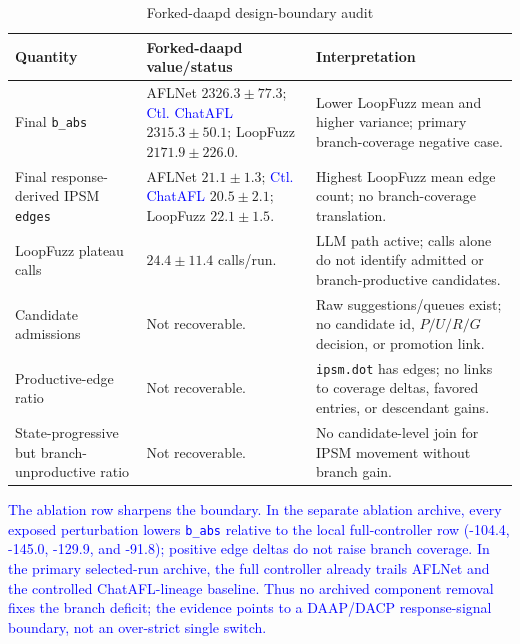 \documentclass[final,5p,times,number]{elsarticle}
\begin{document}
\begin{table}[!t]
\centering
\caption{Forked-daapd design-boundary audit}
\label{tab:forked_design_boundary}
{\scriptsize
\setlength{\tabcolsep}{3.2pt}
\renewcommand{\arraystretch}{0.95}
\begin{tabularx}{\textwidth}{>{\raggedright\arraybackslash}p{}
                              >{\raggedright\arraybackslash}p{}
                              X}
\toprule
\textbf{Quantity} & \textbf{Forked-daapd value/status} & \textbf{Interpretation} \\
\midrule
Final \texttt{b\_abs} &
AFLNet $2326.3{\pm}77.3$; \textcolor{blue}{Ctl. ChatAFL} $2315.3{\pm}50.1$; LoopFuzz $2171.9{\pm}226.0$. &
Lower LoopFuzz mean and higher variance; primary branch-coverage negative case. \\
\midrule
Final response-derived IPSM \texttt{edges} &
AFLNet $21.1{\pm}1.3$; \textcolor{blue}{Ctl. ChatAFL} $20.5{\pm}2.1$; LoopFuzz $22.1{\pm}1.5$. &
Highest LoopFuzz mean edge count; no branch-coverage translation. \\
\midrule
LoopFuzz plateau calls &
$24.4{\pm}11.4$ calls/run. &
LLM path active; calls alone do not identify admitted or branch-productive candidates. \\
\midrule
Candidate admissions &
Not recoverable. &
Raw suggestions/queues exist; no candidate id, $P/U/R/G$ decision, or promotion link. \\
\midrule
Productive-edge ratio &
Not recoverable. &
\texttt{ipsm.dot} has edges; no links to coverage deltas, favored entries, or descendant gains. \\
\midrule
State-progressive but branch-unproductive ratio &
Not recoverable. &
No candidate-level join for IPSM movement without branch gain. \\
\bottomrule
\end{tabularx}
}
\end{table}

\textcolor{blue}{The ablation row sharpens the boundary. In the separate ablation archive, every exposed perturbation lowers \texttt{b\_abs} relative to the local full-controller row (-104.4, -145.0, -129.9, and -91.8); positive edge deltas do not raise branch coverage. In the primary selected-run archive, the full controller already trails AFLNet and the controlled ChatAFL-lineage baseline. Thus no archived component removal fixes the branch deficit; the evidence points to a DAAP/DACP response-signal boundary, not an over-strict single switch.}
\end{document}

